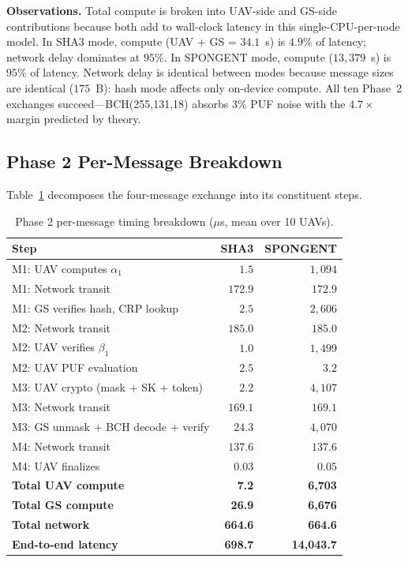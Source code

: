 \documentclass[journal,a4paper,10pt]{IEEEtran}
\begin{document}
\textbf{Observations.} Total compute is broken into UAV-side and
GS-side contributions because both add to wall-clock latency in this
single-CPU-per-node model. In SHA3 mode, compute (UAV + GS =
$34.1$~\textmu s) is $4.9\%$ of latency; network delay dominates at
$95\%$. In SPONGENT mode, compute ($13{,}379$~\textmu s) is $95\%$ of
latency. Network delay is identical between modes because message
sizes are identical ($175$~B): hash mode affects only on-device
compute. All ten Phase~2 exchanges succeed---BCH(255,131,18) absorbs
$3\%$ PUF noise with the $4.7\times$ margin predicted by theory.

\subsection{Phase 2 Per-Message Breakdown}
Table~\ref{tab:phase2_break} decomposes the four-message exchange into
its constituent steps.

\begin{table}[t]
\centering
\caption{Phase 2 per-message timing breakdown
($\mu$s, mean over 10 UAVs).}
\label{tab:phase2_break}
\begin{tabular}{@{}p{4.5cm}rr@{}}
\toprule
\textbf{Step} & \textbf{SHA3} & \textbf{SPONGENT} \\
\midrule
M1: UAV computes $\alpha_1$        & $1.5$    & $1{,}094$ \\
M1: Network transit                & $172.9$  & $172.9$ \\
M1: GS verifies hash, CRP lookup   & $2.5$    & $2{,}606$ \\
M2: Network transit                & $185.0$  & $185.0$ \\
M2: UAV verifies $\beta_1$         & $1.0$    & $1{,}499$ \\
M2: UAV PUF evaluation             & $2.5$    & $3.2$ \\
M3: UAV crypto (mask + SK + token) & $2.2$    & $4{,}107$ \\
M3: Network transit                & $169.1$  & $169.1$ \\
M3: GS unmask + BCH decode + verify & $24.3$  & $4{,}070$ \\
M4: Network transit                & $137.6$  & $137.6$ \\
M4: UAV finalizes                  & $0.03$   & $0.05$ \\
\midrule
\textbf{Total UAV compute}         & \textbf{7.2}   & \textbf{6{,}703} \\
\textbf{Total GS compute}          & \textbf{26.9}  & \textbf{6{,}676} \\
\textbf{Total network}             & \textbf{664.6} & \textbf{664.6} \\
\textbf{End-to-end latency}        & \textbf{698.7} & \textbf{14{,}043.7} \\
\bottomrule
\end{tabular}
\end{table}
\end{document}
